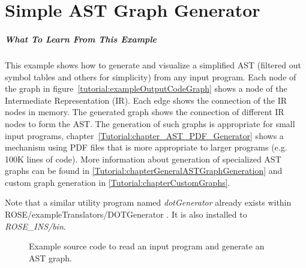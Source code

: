 \chapter{Simple AST Graph Generator}
\label{Tutorial:chapterASTGraphGenerator}

\paragraph{What To Learn From This Example}
This example shows how to generate and visualize a simplified AST (filtered
out symbol tables and others for simplicity) from any input program.
Each node of the graph in figure~\ref{tutorial:exampleOutputCodeGraph} shows
a node of the Intermediate Representation (IR).  Each edge shows the connection
of the IR nodes in memory. The generated graph shows the connection of different 
IR nodes to form the AST.  The generation of such graphs is appropriate for small 
input programs, chapter~\ref{Tutorial:chapter_AST_PDF_Generator} shows a mechanism 
using PDF files that is more appropriate to larger programs (e.g. 100K lines of code).
More information about generation of specialized AST graphs can be found in 
\ref{Tutorial:chapterGeneralASTGraphGeneration} and custom graph generation in
\ref{Tutorial:chapterCustomGraphs}.

Note that a similar utility program named \textit{dotGenerator} already exists within
ROSE/exampleTranslators/DOTGenerator . 
It is also installed to \textit{ROSE\_INS/bin}.  


\begin{figure}[!h]
{\indent
{\mySmallFontSize


\begin{latexonly}
   
\end{latexonly}

\begin{htmlonly}
   
\end{htmlonly}

}
}
\caption{Example source code to read an input program and generate an AST graph.}
\label{Tutorial:exampleASTGraphGenerator}
\end{figure}


